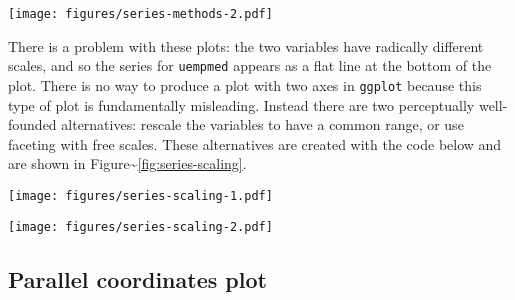 \texttt{[image: figures/series-methods-2.pdf]}

There is a problem with these plots: the two variables have radically
different scales, and so the series for \texttt{uempmed} appears as a
flat line at the bottom of the plot. There is no way to produce a plot
with two axes in \texttt{ggplot} because this type of plot is
fundamentally misleading. Instead there are two perceptually
well-founded alternatives: rescale the variables to have a common range,
or use faceting with free scales. These alternatives are created with
the code below and are shown in
Figure\textasciitilde{}\ref{fig:series-scaling}. 

\begin{Shaded}
\begin{Highlighting}[]
\StringTok{ }
  \StringTok{ } \NormalTok{)}
  \StringTok{ }\NormalTok{rng[}\NormalTok{]) /}\StringTok{ }
\NormalTok{\}}
\StringTok{ } 
  \NormalTok{, }
    
\end{Highlighting}
\end{Shaded}

\texttt{[image: figures/series-scaling-1.pdf]}

\begin{Shaded}
\begin{Highlighting}[]
  \NormalTok{) +}\StringTok{ }
\StringTok{  }\StringTok{ } \NormalTok{)}
\end{Highlighting}
\end{Shaded}

\texttt{[image: figures/series-scaling-2.pdf]}

\subsection{Parallel coordinates plot}\label{sub:molten-data}

